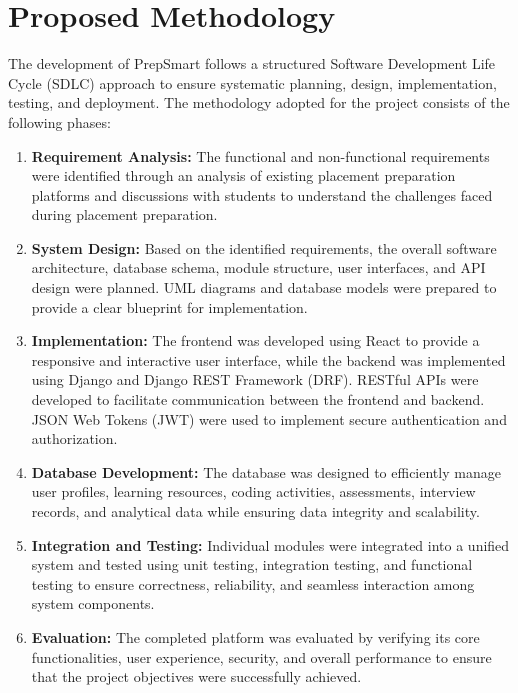 \section{Proposed Methodology}

The development of PrepSmart follows a structured Software Development Life Cycle (SDLC) approach to ensure systematic planning, design, implementation, testing, and deployment. The methodology adopted for the project consists of the following phases:

\begin{enumerate}
    \item \textbf{Requirement Analysis:} The functional and non-functional requirements were identified through an analysis of existing placement preparation platforms and discussions with students to understand the challenges faced during placement preparation.

    \item \textbf{System Design:} Based on the identified requirements, the overall software architecture, database schema, module structure, user interfaces, and API design were planned. UML diagrams and database models were prepared to provide a clear blueprint for implementation.

    \item \textbf{Implementation:} The frontend was developed using React to provide a responsive and interactive user interface, while the backend was implemented using Django and Django REST Framework (DRF). RESTful APIs were developed to facilitate communication between the frontend and backend. JSON Web Tokens (JWT) were used to implement secure authentication and authorization.

    \item \textbf{Database Development:} The database was designed to efficiently manage user profiles, learning resources, coding activities, assessments, interview records, and analytical data while ensuring data integrity and scalability.

    \item \textbf{Integration and Testing:} Individual modules were integrated into a unified system and tested using unit testing, integration testing, and functional testing to ensure correctness, reliability, and seamless interaction among system components.

    \item \textbf{Evaluation:} The completed platform was evaluated by verifying its core functionalities, user experience, security, and overall performance to ensure that the project objectives were successfully achieved.
\end{enumerate}

